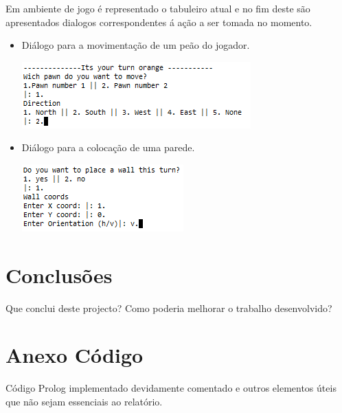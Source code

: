 \documentclass[a4paper]{article}
\begin{document}
Em ambiente de jogo é representado o tabuleiro atual e no fim deste são apresentados dialogos correspondentes á ação a ser tomada no momento.

  \begin{itemize}
		\item Diálogo para a movimentação de um peão do jogador.	
		\begin{center}
			\includegraphics[scale = 0.7]{fig7.png}
		\end{center}
		\item Diálogo para a colocação de uma parede.
		\begin{center}
			\includegraphics[scale = 0.7]{fig8.png}
		\end{center}
	\end{itemize}






\section{Conclusões}
Que conclui deste projecto? Como poderia melhorar o trabalho desenvolvido?


\clearpage
{}
\renewcommand\refname{Bibliografia}



\newpage
\appendix
\section{Anexo Código}
Código Prolog implementado devidamente comentado e outros elementos úteis que não sejam essenciais ao relatório.
\end{document}
